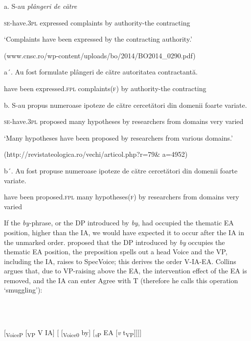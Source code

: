 \documentclass[output=paper]{langsci/langscibook}
\begin{document}
          a.   S-au              \emph{plângeri     de către}

      \textsc{se-}have.3\textsc{pl} expressed complaints by          authority-the contracting

        ‘Complaints have been expressed by the contracting authority.’

             (www.cnsc.ro/wp-content/uploads/bo/2014/BO2014\_0290.pdf)

  a´.   Au   fost  formulate        plângeri          de către autoritatea    contractantă.

        have been expressed.\textsc{fpl} complaints(\textsc{f)} by          authority-the contracting

b.   S-au           propus    numeroase ipoteze de către cercetători din domenii foarte variate.

\textsc{se-}have.3\textsc{pl} proposed many        hypotheses by    researchers from domains very varied

      ‘Many hypotheses have been proposed by researchers from various domains.’

    (http://revistateologica.ro/vechi/articol.php?r=79\& a=4952)  

b´.   Au  fost    propuse   numeroase ipoteze      de către cercetători din domenii foarte variate.

have been proposed.\textsc{fpl} many hypotheses(\textsc{f)} by    researchers from domains very varied

If the \textit{by-}phrase, or the DP introduced by \textit{by}, had occupied the thematic EA position, higher than the IA, we would have expected it to occur after the IA in the unmarked order. \citet{Collins2005} proposed that the DP introduced by \textit{by} occupies the thematic EA position, the preposition spells out a head Voice and the VP, including the IA, raises to SpecVoice; this derives the order V-IA-EA. Collins argues that, due to VP-raising above the EA, the intervention effect of the EA is removed, and the IA can enter Agree with T (therefore he calls this operation ‘smuggling’):

\ea%
    \label{ex:key:30}
    \gll\\
        \\
    \glt
    \z

          [\textsubscript{VoiceP}  [\textsubscript{VP} V IA] [ [\textsubscript{Voice0}  by] [\textit{\textsubscript{v}}\textsubscript{P} EA [\textit{v} t\textsubscript{VP}]]]]
\end{document}
